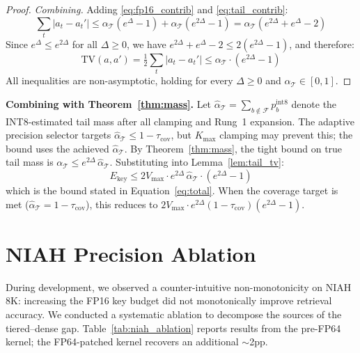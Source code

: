 \documentclass[11pt,a4paper]{article}
\theoremstyle{definition}
\theoremstyle{remark}
\begin{document}
\begin{proof}
\emph{Combining.}  Adding \eqref{eq:fp16_contrib} and \eqref{eq:tail_contrib}:
\[
  \sum_t |a_t - a_t'| \leq \alpha_{\mathcal{T}}(e^{\Delta} - 1) + \alpha_{\mathcal{T}}(e^{2\Delta} - 1)
  = \alpha_{\mathcal{T}}(e^{2\Delta} + e^{\Delta} - 2)
\]
Since $e^{\Delta} \leq e^{2\Delta}$ for all $\Delta \geq 0$, we have $e^{2\Delta} + e^{\Delta} - 2 \leq 2(e^{2\Delta} - 1)$, and therefore:
\[
  \mathrm{TV}(a, a') = \tfrac{1}{2}\sum_t |a_t - a_t'| \leq \alpha_{\mathcal{T}} \cdot (e^{2\Delta} - 1)
\]
All inequalities are non-asymptotic, holding for every $\Delta \geq 0$ and $\alpha_{\mathcal{T}} \in [0,1]$.
\end{proof}

\textbf{Combining with Theorem~\ref{thm:mass}.}  Let $\hat{\alpha}_{\mathcal{T}} = \sum_{b \notin \mathcal{F}} p_b^{\mathrm{int8}}$ denote the INT8-estimated tail mass after all clamping and Rung~1 expansion.  The adaptive precision selector targets $\hat{\alpha}_{\mathcal{T}} \leq 1 - \tau_{\mathrm{cov}}$, but $K_{\max}$ clamping may prevent this; the bound uses the achieved $\hat{\alpha}_{\mathcal{T}}$.  By Theorem~\ref{thm:mass}, the tight bound on true tail mass is $\alpha_{\mathcal{T}} \leq e^{2\Delta}\,\hat{\alpha}_{\mathcal{T}}$.  Substituting into Lemma~\ref{lem:tail_tv}:
\[
  E_{\mathrm{key}} \leq 2V_{\max} \cdot e^{2\Delta}\,\hat{\alpha}_{\mathcal{T}} \cdot (e^{2\Delta} - 1)
\]
which is the bound stated in Equation~\eqref{eq:total}.  When the coverage target is met ($\hat{\alpha}_{\mathcal{T}} = 1 - \tau_{\mathrm{cov}}$), this reduces to $2V_{\max} \cdot e^{2\Delta}(1 - \tau_{\mathrm{cov}})(e^{2\Delta} - 1)$.

\section{NIAH Precision Ablation}
\label{app:niah_ablation}

During development, we observed a counter-intuitive non-monotonicity on NIAH 8K: increasing the FP16 key budget did not monotonically improve retrieval accuracy.  We conducted a systematic ablation to decompose the sources of the tiered--dense gap.  Table~\ref{tab:niah_ablation} reports results from the pre-FP64 kernel; the FP64-patched kernel recovers an additional $\sim$2pp.
\end{document}
